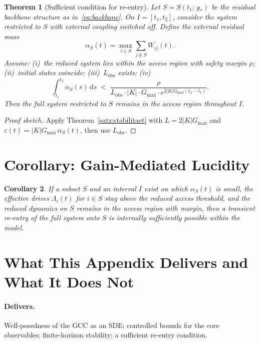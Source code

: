 \documentclass[11pt,a4paper]{article}
\theoremstyle{plain}
\newtheorem{theorem}{Theorem}[section]
\newtheorem{corollary}[theorem]{Corollary}
\theoremstyle{definition}
\theoremstyle{remark}
\newcommand{\Gmax}{G_{\max}}
\newcommand{\Lobs}{L_{\mathrm{obs}}}
\begin{document}
\begin{theorem}[Sufficient condition for re-entry]
\label{satz:reentry}
Let $S = S(t_1;\,g_*)$ be the residual backbone structure as in~\eqref{eq:backbone}. On $I = [t_1,t_2]$, consider the system restricted to $S$ with external coupling switched off. Define the external residual mass
\begin{equation}
\alpha_S(t) = \max_{i \in S}\sum_{j \notin S} W_{ij}(t).
\end{equation}
Assume: (i)~the reduced system lies within the access region with safety margin $\rho$; (ii)~initial states coincide; (iii)~$\Lobs$ exists; (iv)~
\begin{equation}
\label{eq:eta}
\int_{t_1}^{t_2} \alpha_S(s)\,\mathrm{d}s \;<\; \frac{\rho}{\Lobs \cdot |K| \cdot \Gmax \cdot e^{2|K|\Gmax(t_2 - t_1)}}.
\end{equation}
Then the full system restricted to $S$ remains in the access region throughout $I$.
\end{theorem}

\begin{proof}[Proof sketch]
Apply Theorem~\ref{satz:stabilitaet} with $L = 2|K|\Gmax$ and $\varepsilon(t) = |K|\Gmax\,\alpha_S(t)$, then use $\Lobs$.
\end{proof}

\section{Corollary: Gain-Mediated Lucidity}

\begin{corollary}
\label{kor:lucidity}
If a subset $S$ and an interval $I$ exist on which $\alpha_S(t)$ is small, the effective drives $\Lambda_i(t)$ for $i \in S$ stay above the reduced access threshold, and the reduced dynamics on $S$ remains in the access region with margin, then a transient re-entry of the full system onto $S$ is internally sufficiently possible within the model.
\end{corollary}

\section{What This Appendix Delivers and What It Does Not}

\paragraph{Delivers.}
Well-posedness of the GCC as an SDE; controlled bounds for the core observables; finite-horizon stability; a sufficient re-entry condition.
\end{document}
